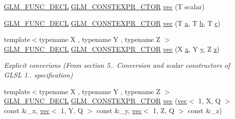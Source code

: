 \begin{DoxyCompactItemize}
\item 
\mbox{\hyperlink{setup_8hpp_ab2d052de21a70539923e9bcbf6e83a51}{G\+L\+M\+\_\+\+F\+U\+N\+C\+\_\+\+D\+E\+CL}} \mbox{\hyperlink{setup_8hpp_ad34178a09666081abdb573c14d1f4a5a}{G\+L\+M\+\_\+\+C\+O\+N\+S\+T\+E\+X\+P\+R\+\_\+\+C\+T\+OR}} \mbox{\hyperlink{structglm_1_1vec_3_013_00_01_t_00_01_q_01_4_a3969041c27af93819cfcc2ca0a410277}{vec}} (T scalar)
\item 
\mbox{\hyperlink{setup_8hpp_ab2d052de21a70539923e9bcbf6e83a51}{G\+L\+M\+\_\+\+F\+U\+N\+C\+\_\+\+D\+E\+CL}} \mbox{\hyperlink{setup_8hpp_ad34178a09666081abdb573c14d1f4a5a}{G\+L\+M\+\_\+\+C\+O\+N\+S\+T\+E\+X\+P\+R\+\_\+\+C\+T\+OR}} \mbox{\hyperlink{structglm_1_1vec_3_013_00_01_t_00_01_q_01_4_ac155207ddc7d4472ce12d1f874cb0bcc}{vec}} (T \mbox{\hyperlink{_s_d_l__opengl__glext_8h_a3309789fc188587d666cda5ece79cf82}{a}}, T \mbox{\hyperlink{_s_d_l__opengl__glext_8h_a0f71581a41fd2264c8944126dabbd010}{b}}, T \mbox{\hyperlink{_s_d_l__opengl__glext_8h_a1f2d7f8147412c43ba2303a56f97ee73}{c}})
\item 
{\footnotesize template$<$typename X , typename Y , typename Z $>$ }\\\mbox{\hyperlink{setup_8hpp_ab2d052de21a70539923e9bcbf6e83a51}{G\+L\+M\+\_\+\+F\+U\+N\+C\+\_\+\+D\+E\+CL}} \mbox{\hyperlink{setup_8hpp_ad34178a09666081abdb573c14d1f4a5a}{G\+L\+M\+\_\+\+C\+O\+N\+S\+T\+E\+X\+P\+R\+\_\+\+C\+T\+OR}} \mbox{\hyperlink{structglm_1_1vec_3_013_00_01_t_00_01_q_01_4_a9d9e0c35f6991046e1f8f68088dc0f9a}{vec}} (X \mbox{\hyperlink{_s_d_l__opengl_8h_ad0e63d0edcdbd3d79554076bf309fd47}{x}}, Y \mbox{\hyperlink{_s_d_l__opengl_8h_a1675d9d7bb68e1657ff028643b4037e3}{y}}, Z \mbox{\hyperlink{_s_d_l__opengl__glext_8h_a5e74030ebb3297ce1b37ff716fedd68f}{z}})
\begin{DoxyCompactList}\small\item\em Explicit converions (From section 5.. Conversion and scalar constructors of G\+L\+SL 1.. specification) \end{DoxyCompactList}\item 
{\footnotesize template$<$typename X , typename Y , typename Z $>$ }\\\mbox{\hyperlink{setup_8hpp_ab2d052de21a70539923e9bcbf6e83a51}{G\+L\+M\+\_\+\+F\+U\+N\+C\+\_\+\+D\+E\+CL}} \mbox{\hyperlink{setup_8hpp_ad34178a09666081abdb573c14d1f4a5a}{G\+L\+M\+\_\+\+C\+O\+N\+S\+T\+E\+X\+P\+R\+\_\+\+C\+T\+OR}} \mbox{\hyperlink{structglm_1_1vec_3_013_00_01_t_00_01_q_01_4_a9aa0a92a8278c84bf0fd3090cbc414d6}{vec}} (\mbox{\hyperlink{structglm_1_1vec}{vec}}$<$ 1, X, Q $>$ const \&\+\_\+x, \mbox{\hyperlink{structglm_1_1vec}{vec}}$<$ 1, Y, Q $>$ const \&\+\_\+y, \mbox{\hyperlink{structglm_1_1vec}{vec}}$<$ 1, Z, Q $>$ const \&\+\_\+z)

\end{DoxyCompactItemize}
